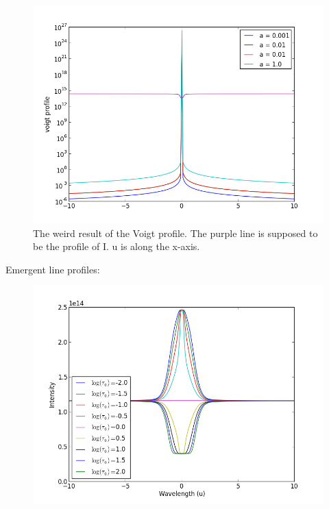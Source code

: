 \documentclass[norsk,a4paper,12pt]{article}
\begin{document}
\begin{figure}[H] 
\begin{center} 
\includegraphics[scale=0.5]{ssa33_1.png} 
 

\caption{The weird result of the Voigt profile. The purple line is supposed to be the profile of I. u is along the x-axis. } 
\end{center} 
\end{figure}


Emergent line profiles:

\begin{figure}[H] 
\begin{center} 
\includegraphics[scale=0.5]{ssa33_2.png} 
 

\caption{} 
\end{center} 
\end{figure}
\end{document}
